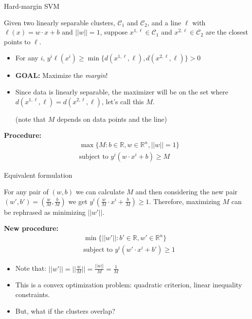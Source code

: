 \documentclass{beamer}
\begin{document}
\begin{frame}{Hard-margin SVM}

Given two linearly separable clusters, $\mathcal{C}_1$ and $\mathcal{C}_2$, and a line $\ell$ with $ \ell(x) = w\cdot x + b$ and $||w||=1$, suppose $x^{1,\ell} \in \mathcal{C}_1$ and $x^{2,\ell} \in \mathcal{C}_2$ are the closest points to $\ell$.
\begin{itemize}
    \item For any $i$, $y^i\ell(x^i) \geq \min \{d(x^{1,\ell},\ell), d(x^{2,\ell},\ell)\}> 0 $
    \item \textbf{GOAL:} Maximize the \textit{margin}!%
    \item Since data is linearly separable, the maximizer will be on the set where $d(x^{1,\ell},\ell)=d(x^{2,\ell},\ell)$, let's call this $M$.
    
    (note that $M$ depends on data points and the line)
\end{itemize}

\pause
\vspace{0.5cm}
\textbf{Procedure:}
\begin{align}
& \max \{M:b\in\mathbb{R}, w \in\mathbb{R}^n, ||w||=1\} \\
& \text{subject to } y^i(w\cdot x^i + b)\geq M
\end{align}

\end{frame}



\begin{frame}{Equivalent formulation}

For any pair of $(w,b)$ we can calculate $M$ and then considering the new pair $(w',b')=(\frac{w}{M}, \frac{b}{M})$ we get $y^i(\frac{w}{M}\cdot x^i + \frac{b}{M})\geq 1$. Therefore, maximizing $M$ can be rephrased as minimizing $||w'||$.

\vspace{0.5cm}
\textbf{New procedure:}
\begin{align}
& \min \{||w'||:b'\in\mathbb{R}, w' \in\mathbb{R}^n\} \\
& \text{subject to } y^i(w'\cdot x^i + b')\geq 1
\end{align}
\begin{itemize}
    \item Note that: $||w'||=||\frac{w}{M}||=\frac{||w||}{M}=\frac{1}{M}$
    \item This is a convex optimization problem: quadratic criterion, linear inequality constraints.
    \item But, what if the clusters overlap?
\end{itemize}
\end{frame}
\end{document}
